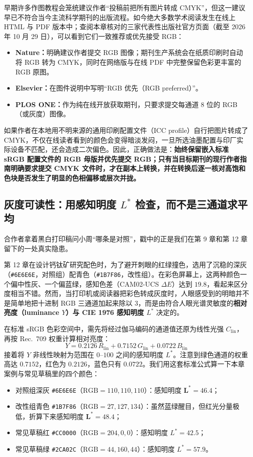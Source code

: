 早期许多作图教程会笼统建议作者“投稿前把所有图片转成 CMYK”，但这一建议早已不符合当今主流科学期刊的出版流程。如今绝大多数学术阅读发生在线上 HTML 与 PDF 版本中；查阅本章核对的三家代表性出版社官方页面（截至 2026 年 10 月 29 日），可以看到它们一致推荐或优先接受 RGB：
\begin{itemize}
\item \textbf{Nature：}明确建议作者提交 RGB 图像；期刊生产系统会在纸质印刷时自动将 RGB 转为 CMYK，同时在网络版与在线 PDF 中完整保留色彩更丰富的 RGB 原图。
\item \textbf{Elsevier：}在图件说明中写明“RGB 优先（RGB preferred）”。
\item \textbf{PLOS ONE：}作为纯在线开放获取期刊，只要求提交每通道 8 位的 RGB（或灰度）图像。
\end{itemize}

如果作者在本地用不明来源的通用印刷配置文件（ICC profile）自行把图片转成了 CMYK，不仅在线读者看到的颜色会变得暗淡发闷，一旦所选油墨配置与印厂实际设备不匹配，还会造成二次偏色。因此，正确做法是：\textbf{始终保留嵌入标准 sRGB 配置文件的 RGB 母版并优先提交 RGB；只有当目标期刊的现行作者指南明确要求提交 CMYK 文件时，才在副本上转换，并在转换后逐一核对高饱和色块是否发生了明显的色相偏移或层次并拢。}

\subsection*{灰度可读性：用感知明度 $L^*$ 检查，而不是三通道求平均}

合作者拿着黑白打印稿问小周“哪条是对照”，戳中的正是我们在第 9 章和第 12 章留下的一处真实隐患。

第 12 章在设计钙钛矿研究配色时，为了避开刺眼的红绿撞色，选用了沉稳的深灰（\texttt{\#6E6E6E}，对照组）配青色（\texttt{\#1B7F86}，改性组）。在彩色屏幕上，这两种颜色一个偏中性灰、一个偏蓝绿，感知色差（CAM02-UCS $\Delta E$）达到 $19.8$，看起来区分度相当不错。然而，当打印机或阅读器把彩色转成灰度时，人眼感受到的明暗并不是简单地把十进制 RGB 三通道加起来除以 3，而是由符合人眼光谱灵敏度的\textbf{相对亮度（luminance $Y$）与 CIE 1976 感知明度 $L^*$} 决定的。

在标准 sRGB 色彩空间中，需先将经过伽马编码的通道值还原为线性光强 $C_{\text{lin}}$，再按 Rec.~709 权重计算相对亮度：
\[
Y = 0.2126\,R_{\text{lin}} + 0.7152\,G_{\text{lin}} + 0.0722\,B_{\text{lin}}
\]
接着将 $Y$ 非线性映射为范围在 $0\text{--}100$ 之间的感知明度 $L^*$。注意到绿色通道的权重高达 $0.7152$，红色为 $0.2126$，蓝色只有 $0.0722$。我们用这套标准公式算一下本章案例与常见草稿里的四个颜色：
\begin{itemize}
\item 对照组深灰 \texttt{\#6E6E6E}（$\text{RGB} = 110, 110, 110$）：感知明度 $\mathbf{L^* = 46.4}$；
\item 改性组青色 \texttt{\#1B7F86}（$\text{RGB} = 27, 127, 134$）：虽然蓝绿醒目，但红光分量极低，折算下来感知明度 $\mathbf{L^* = 48.4}$；
\item 常见草稿红 \texttt{\#CC0000}（$\text{RGB} = 204, 0, 0$）：感知明度 $L^* = 42.5$；
\item 常见草稿绿 \texttt{\#2CA02C}（$\text{RGB} = 44, 160, 44$）：感知明度 $L^* = 57.9$。
\end{itemize}

